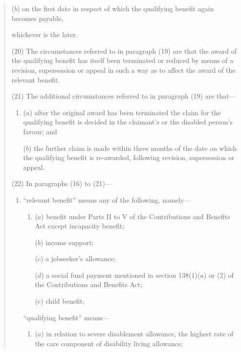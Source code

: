 \documentclass[12pt,a4paper]{article}
\begin{document}
\begin{enumerate}
\begin{quotation}
\begin{enumerate}
($b$) on the first date in respect of which the qualifying benefit again becomes payable,
\end{enumerate}
whichever is the later.

(20) The circumstances referred to in paragraph (19) are that the award of the qualifying benefit has itself been terminated or reduced by means of a revision, supersession or appeal in such a way as to affect the award of the relevant benefit.

(21) The additional circumstances referred to in paragraph (19) are that—
\begin{enumerate}\item[]
\begin{sloppypar}
($a$) after the original award has been terminated the claim for the qualifying benefit is decided in the claimant’s or the disabled person’s favour; and
\end{sloppypar}

($b$) the further claim is made within three months of the date on which the qualifying benefit is re-awarded, following revision, supersession or appeal.
\end{enumerate}

(22) In paragraphs (16) to (21)—
\begin{enumerate}\item[]
\begin{sloppypar}
“relevant benefit” means any of the following, namely—
\end{sloppypar}
\begin{enumerate}\item[]
($a$) 
benefit under Parts II to V of the Contributions and Benefits Act except incapacity benefit;

($b$) 
income support;

($c$) 
a jobseeker’s allowance;

\begin{sloppypar}
($d$) 
a social fund payment mentioned in section 138(1)($a$)  or (2) of the Contributions and Benefits Act;
\end{sloppypar}

($e$) 
child benefit;
\end{enumerate}

“qualifying benefit” means—
\begin{enumerate}\item[]
($a$) 
in relation to severe disablement allowance, the highest rate of the care component of disability living allowance;


\end{enumerate}
\end{enumerate}
\end{quotation}
\end{enumerate}
\end{document}
